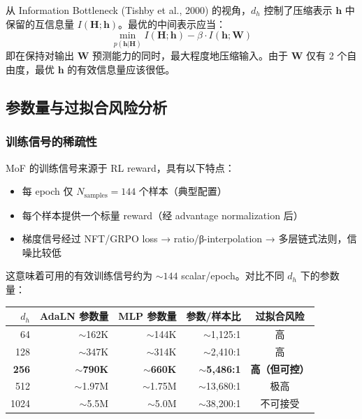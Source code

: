 \documentclass[11pt,a4paper]{article}
\begin{document}
从 Information Bottleneck (Tishby et al., 2000) 的视角，$d_h$ 控制了压缩表示 $\mathbf{h}$ 中保留的互信息量 $I(\mathbf{H}; \mathbf{h})$。最优的中间表示应当：
\begin{equation}
\min_{p(\mathbf{h}|\mathbf{H})} I(\mathbf{H}; \mathbf{h}) - \beta \cdot I(\mathbf{h}; \mathbf{W})
\end{equation}
即在保持对输出 $\mathbf{W}$ 预测能力的同时，最大程度地压缩输入。由于 $\mathbf{W}$ 仅有 2 个自由度，最优 $\mathbf{h}$ 的有效信息量应该很低。

\subsection{参数量与过拟合风险分析}

\subsubsection{训练信号的稀疏性}

MoF 的训练信号来源于 RL reward，具有以下特点：
\begin{itemize}
    \item 每 epoch 仅 $N_{\text{samples}} = 144$ 个样本（典型配置）
    \item 每个样本提供一个标量 reward（经 advantage normalization 后）
    \item 梯度信号经过 NFT/GRPO loss → ratio/β-interpolation → 多层链式法则，信噪比较低
\end{itemize}

这意味着可用的有效训练信号约为 $\sim 144$ scalar/epoch。对比不同 $d_h$ 下的参数量：

\begin{center}
\begin{tabular}{r|rrr|c}
\toprule
$d_h$ & \textbf{AdaLN 参数量} & \textbf{MLP 参数量} & \textbf{参数/样本比} & \textbf{过拟合风险} \\
\midrule
64    & $\sim$162K & $\sim$144K & $\sim$1,125:1 & 高 \\
128   & $\sim$347K & $\sim$314K & $\sim$2,410:1 & 高 \\
\textbf{256}  & $\sim$\textbf{790K} & $\sim$\textbf{660K} & $\sim$\textbf{5,486:1} & \textbf{高（但可控）} \\
512   & $\sim$1.97M & $\sim$1.75M & $\sim$13,680:1 & 极高 \\
1024  & $\sim$5.5M & $\sim$5.0M & $\sim$38,200:1 & 不可接受 \\
\bottomrule
\end{tabular}
\end{center}
\end{document}
